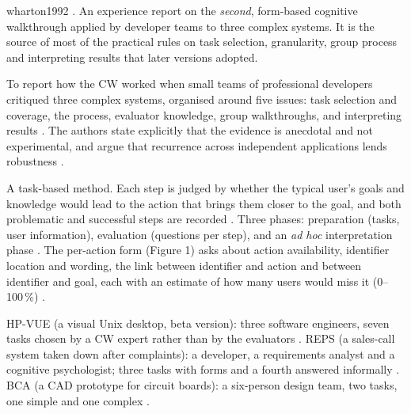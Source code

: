 \begin{papercard}{wharton1992}
 . An experience report on the \emph{second}, form-based cognitive walkthrough applied by developer teams to three complex systems. It is the source of most of the practical rules on task selection, granularity, group process and interpreting results that later versions adopted.

 To report how the CW worked when small teams of professional developers critiqued three complex systems, organised around five issues: task selection and coverage, the process, evaluator knowledge, group walkthroughs, and interpreting results . The authors state explicitly that the evidence is anecdotal and not experimental, and argue that recurrence across independent applications lends robustness .

 A task-based method. Each step is judged by whether the typical user's goals and knowledge would lead to the action that brings them closer to the goal, and both problematic and successful steps are recorded . Three phases: preparation (tasks, user information), evaluation (questions per step), and an \emph{ad hoc} interpretation phase . The per-action form (Figure 1) asks about action availability, identifier location and wording, the link between identifier and action and between identifier and goal, each with an estimate of how many users would miss it (0--100\,\%) .

 HP-VUE (a visual Unix desktop, beta version): three software engineers, seven tasks chosen by a CW expert rather than by the evaluators . REPS (a sales-call system taken down after complaints): a developer, a requirements analyst and a cognitive psychologist; three tasks with forms and a fourth answered informally . BCA (a CAD prototype for circuit boards): a six-person design team, two tasks, one simple and one complex .


\end{papercard}

